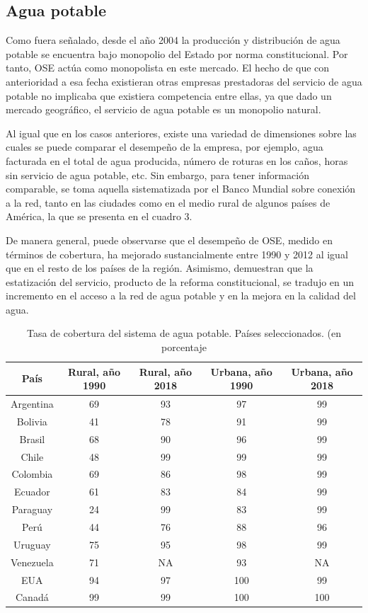 \documentclass[
  12pt,
  spanish,
]{book}
\begin{document}
\hypertarget{agua-potable}{%
\subsection{Agua potable}\label{agua-potable}}

Como fuera señalado, desde el año 2004 la producción y distribución de agua potable se encuentra bajo monopolio del Estado por norma constitucional. Por tanto, OSE actúa como monopolista en este mercado. El hecho de que con anterioridad a esa fecha existieran otras empresas prestadoras del servicio de agua potable no implicaba que existiera competencia entre ellas, ya que dado un mercado geográfico, el servicio de agua potable es un monopolio natural.

Al igual que en los casos anteriores, existe una variedad de dimensiones sobre las cuales se puede comparar el desempeño de la empresa, por ejemplo, agua facturada en el total de agua producida, número de roturas en los caños, horas sin servicio de agua potable, etc. Sin embargo, para tener información comparable, se toma aquella sistematizada por el Banco Mundial sobre conexión a la red, tanto en las ciudades como en el medio rural de algunos países de América, la que se presenta en el cuadro 3.

De manera general, puede observarse que el desempeño de OSE, medido en términos de cobertura, ha mejorado sustancialmente entre 1990 y 2012 al igual que en el resto de los países de la región. Asimismo, \citet{Borraz2013} demuestran que la estatización del servicio, producto de la reforma constitucional, se tradujo en un incremento en el acceso a la red de agua potable y en la mejora en la calidad del agua.

\begin{table}

\caption{\label{tab:cuadro8}Tasa de cobertura del sistema de agua potable. Países seleccionados. (en porcentaje}
\centering
\begin{tabular}[t]{c|c|c|c|c}
\hline
País & Rural, año 1990 & Rural, año 2018 & Urbana, año 1990 & Urbana, año 2018\\
\hline
Argentina & 69 & 93 & 97 & 99\\
\hline
Bolivia & 41 & 78 & 91 & 99\\
\hline
Brasil & 68 & 90 & 96 & 99\\
\hline
Chile & 48 & 99 & 99 & 99\\
\hline
Colombia & 69 & 86 & 98 & 99\\
\hline
Ecuador & 61 & 83 & 84 & 99\\
\hline
Paraguay & 24 & 99 & 83 & 99\\
\hline
Perú & 44 & 76 & 88 & 96\\
\hline
Uruguay & 75 & 95 & 98 & 99\\
\hline
Venezuela & 71 & NA & 93 & NA\\
\hline
EUA & 94 & 97 & 100 & 99\\
\hline
Canadá & 99 & 99 & 100 & 100\\
\hline
\end{tabular}
\end{table}
\end{document}
